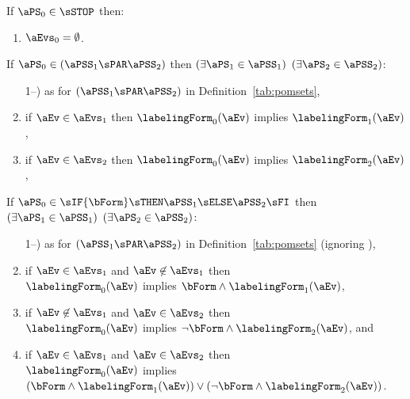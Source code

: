 \begin{definition}
  If $\aPS_0\in\sSTOP$ then:
  \begin{enumerate}
  \item $\aEvs_0 = \emptyset$.
  \end{enumerate}

  \noindent
  If $\aPS_0 \in (\aPSS_1\sPAR\aPSS_2)$ then
  $(\exists\aPS_1\in\aPSS_1)$ $(\exists\aPS_2\in\aPSS_2)$:
  \begin{enumerate}
     \setcounter{enumi}{\value{pomsetParDisjointXount}}
  \item[1--\thepomsetParDisjointXount)] as for $(\aPSS_1\sPAR\aPSS_2)$ in Definition~\ref{tab:pomsets},
  \item if $\aEv\in\aEvs_1$ then $\labelingForm_0(\aEv)$ implies $\labelingForm_1(\aEv)$,
  \item if $\aEv\in\aEvs_2$ then $\labelingForm_0(\aEv)$ implies $\labelingForm_2(\aEv)$,
    \setcounter{pomsetPreParXount}{\value{enumi}}
  \end{enumerate}

  \noindent
  If $\aPS_0 \in \sIF{\bForm}\sTHEN\aPSS_1\sELSE\aPSS_2\sFI$ then
  $(\exists\aPS_1\in\aPSS_1)$ $(\exists\aPS_2\in\aPSS_2)$:
  \begin{enumerate}
  \setcounter{enumi}{\value{pomsetParXount}}
  \item[1--\thepomsetParXount)] as for $(\aPSS_1\sPAR\aPSS_2)$  in
    Definition~\ref{tab:pomsets} (ignoring \thepomsetParDisjointXount),
  \item if $\aEv\in\aEvs_1$ and $\aEv\not\in\aEvs_1$ then\\ $\labelingForm_0(\aEv)$ implies $\bForm\land\labelingForm_1(\aEv)$,
  \item if $\aEv\not\in\aEvs_1$ and $\aEv\in\aEvs_2$ then\\ $\labelingForm_0(\aEv)$ implies $\neg\bForm\land\labelingForm_2(\aEv)$, and
  \item if $\aEv\in\aEvs_1$ and $\aEv\in\aEvs_2$ then\\ $\labelingForm_0(\aEv)$ implies $(\bForm\land\labelingForm_1(\aEv))\lor(\neg\bForm\land\labelingForm_2(\aEv))$.
    \setcounter{pomsetPreIfXount}{\value{enumi}}
  \end{enumerate}


\end{definition}
